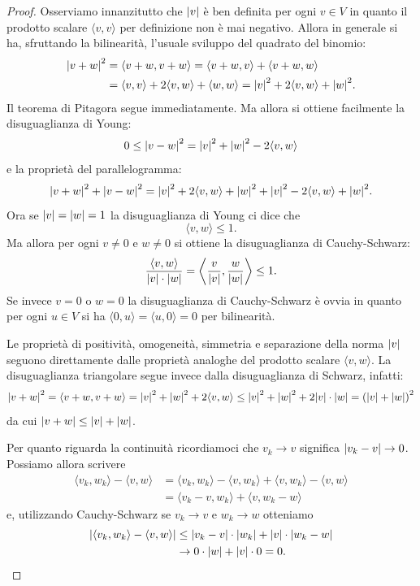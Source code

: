 \begin{proof}
Osserviamo innanzitutto che ${\left|v\right|}$ è ben definita per ogni $v\in V$
in quanto il prodotto scalare $\langle v,v\rangle$ per definizione non è mai negativo.
Allora in generale si ha, sfruttando la bilinearità,
l'usuale sviluppo del quadrato del binomio:
\begin{align*}
  {\left|v+w\right|}^2
  &= \langle v+w, v+w\rangle
  = \langle v+w, v\rangle + \langle v+w, w\rangle \\
  &= \langle v,v\rangle + 2\langle v,w \rangle + \langle w,w\rangle
  = {\left|v\right|}^2 + 2\langle v,w \rangle + {\left|w\right|}^2.
\end{align*}
Il teorema di Pitagora segue immediatamente.
Ma allora si ottiene facilmente la disuguaglianza di Young:
\[
  0 \le {\left|v-w\right|}^2 = {\left|v\right|}^2 + {\left|w\right|}^2 - 2 \langle v,w\rangle
\]
e la proprietà del parallelogramma:
\[
  {\left|v+w\right|}^2 + {\left|v-w\right|}^2
  = {\left|v\right|}^2 + 2\langle v,w \rangle + {\left|w\right|}^2
    + {\left|v\right|}^2 - 2\langle v,w\rangle + {\left|w\right|}^2.
\]
Ora se ${\left|v\right|}={\left|w\right|}=1$ la disuguaglianza di Young ci dice che
\[
  \langle v,w \rangle \le 1.
\]
Ma allora per ogni $v\neq 0$ e $w \neq 0$ si ottiene
la disuguaglianza di Cauchy-Schwarz:
\[
\frac{\langle v,w\rangle}{{\left|v\right|}\cdot {\left|w\right|}}
 = \left\langle \frac{v}{{\left|v\right|}} , \frac{w}{{\left|w\right|}}\right\rangle
 \le 1.
\]
Se invece $v=0$ o $w=0$ la disuguaglianza di Cauchy-Schwarz è ovvia in quanto
per ogni $u\in V$ si ha
$\langle 0, u\rangle = \langle u,0\rangle = 0$ per bilinearità.

Le proprietà di positività, omogeneità, simmetria e separazione della 
norma ${\left|v\right|}$ seguono direttamente dalle proprietà analoghe 
del prodotto scalare $\langle v,w\rangle$.  
La disuguaglianza triangolare segue invece dalla 
disuguaglianza di Schwarz,
infatti:
\[
 {\left|v+w\right|}^2 = \langle v+w, v+w\rangle 
 = {\left|v\right|}^2 + {\left|w\right|}^2 + 2 \langle v,w\rangle 
 \le {\left|v\right|}^2 + {\left|w\right|}^2 + 2 {\left|v\right|}\cdot {\left|w\right|}
 = {\left( {\left|v\right|} + {\left|w\right|} \right)}^2
\]
da cui ${\left|v+w\right|} \le {\left|v\right|} + {\left|w\right|}$.


Per quanto riguarda la continuità
ricordiamoci che $v_k \to v$ significa ${\left|v_k-v\right|}\to 0$.
Possiamo allora scrivere
\begin{align*}
  \langle v_k,w_k\rangle - \langle v,w\rangle
&= \langle v_k,w_k\rangle - \langle v, w_k\rangle +  \langle v,w_k\rangle - \langle v,w\rangle \\
&= \langle v_k - v, w_k\rangle + \langle v, w_k -w\rangle
\end{align*}
e, utilizzando Cauchy-Schwarz se $v_k\to v$ e $w_k\to w$ otteniamo
\begin{align*}
{\left|\langle v_k,w_k\rangle - \langle v,w\rangle\right|}
&\le {\left|v_k-v\right|}\cdot {\left|w_k\right|} + {\left|v\right|}\cdot {\left|w_k-w\right|}\\
&\to 0\cdot {\left|w\right|} + {\left|v\right|}\cdot 0 = 0.
\end{align*}
\end{proof}

